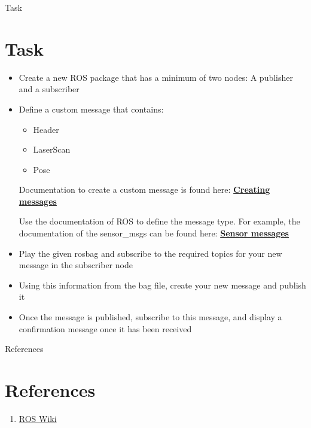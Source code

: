 \documentclass{beamer}
\begin{document}
\begin{frame}{Task}
	\section{Task}
	\begin{itemize}
		\item Create a new ROS package that has a minimum of two nodes: A publisher and a subscriber
		\item Define a custom message that contains:
		\begin{itemize}
			\item Header
			\item LaserScan
			\item Pose
		\end{itemize}
		Documentation to create a custom message is found here: 
	    \textbf{\href{http://wiki.ros.org/ROS/Tutorials/CreatingMsgAndSrv}{Creating messages}}
	    
		Use the documentation of ROS to define the message type. For example, the documentation of the sensor\_msgs can be found here: \textbf{\href{http://docs.ros.org/api/sensor_msgs/html/index-msg.html}{Sensor messages}}
		\item Play the given rosbag and subscribe to the required topics for your new message in the subscriber node
		\item Using this information from the bag file, create your new message and publish it
		\item Once the message is published, subscribe to this message, and display a confirmation message once it has been received
	\end{itemize}
\end{frame}

\begin{frame}{References}
	\section{References}
	\begin{enumerate}
		\item {\href{http://wiki.ros.org/custom/images/wiki/ROS_basic_concepts.png}{ROS Wiki}}
	\end{enumerate}
\end{frame}
\end{document}
